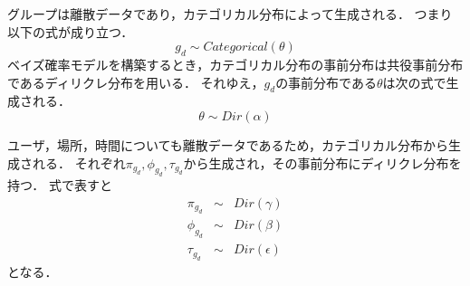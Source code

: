 \documentclass[a4j,10pt, twocolumn]{jarticle}
\begin{document}
グループは離散データであり，カテゴリカル分布によって生成される．
つまり以下の式が成り立つ．
\begin{equation}
  g_d \sim Categorical(\theta)
\end{equation}
ベイズ確率モデルを構築するとき，カテゴリカル分布の事前分布は共役事前分布であるディリクレ分布を用いる．
それゆえ，$g_d$の事前分布である$\theta$は次の式で生成される．
\begin{equation}
  \theta \sim Dir(\alpha)
\end{equation}

ユーザ，場所，時間についても離散データであるため，カテゴリカル分布から生成される．
それぞれ$\pi_{g_d}, \phi_{g_d}, \tau_{g_d}$から生成され，その事前分布にディリクレ分布を持つ．
式で表すと
\begin{eqnarray}
  \pi_{g_d} &\sim& Dir(\gamma) \nonumber \\ 
  \label{prior-distribution-generate}
  \phi_{g_d} &\sim & Dir(\beta) \\
  \tau_{g_d} &\sim& Dir(\epsilon) \nonumber
\end{eqnarray}
となる．
\end{document}
